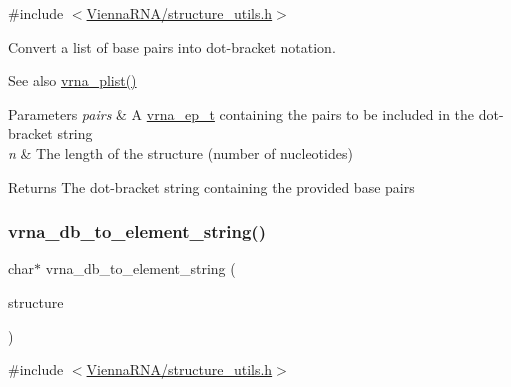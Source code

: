 {\ttfamily \#include $<$\mbox{\hyperlink{structure__utils_8h}{Vienna\+R\+N\+A/structure\+\_\+utils.\+h}}$>$}



Convert a list of base pairs into dot-\/bracket notation. 

\begin{DoxySeeAlso}{See also}
\mbox{\hyperlink{group__struct__utils_gaf002d69024d709744664a8b9ca3dd77d}{vrna\+\_\+plist()}} 
\end{DoxySeeAlso}

\begin{DoxyParams}{Parameters}
{\em pairs} & A \mbox{\hyperlink{group__struct__utils_gab9ac98ab55ded9fb90043b024b915aca}{vrna\+\_\+ep\+\_\+t}} containing the pairs to be included in the dot-\/bracket string \\
\hline
{\em n} & The length of the structure (number of nucleotides) \\
\hline
\end{DoxyParams}
\begin{DoxyReturn}{Returns}
The dot-\/bracket string containing the provided base pairs 
\end{DoxyReturn}
\mbox{\label{group__struct__utils_ga45360c09fb6d04d96e42dcccbb66015b}} 
\subsubsection{\texorpdfstring{vrna\+\_\+db\+\_\+to\+\_\+element\+\_\+string()}{vrna\_db\_to\_element\_string()}}
{\footnotesize\ttfamily char$\ast$ vrna\+\_\+db\+\_\+to\+\_\+element\+\_\+string (\begin{DoxyParamCaption}\item[{const char $\ast$}]{structure }\end{DoxyParamCaption})}



{\ttfamily \#include $<$\mbox{\hyperlink{structure__utils_8h}{Vienna\+R\+N\+A/structure\+\_\+utils.\+h}}$>$}

\mbox{\label{group__struct__utils_ga7ca60670fbbf23ae2ac9f63e5dbf8aef}} 
